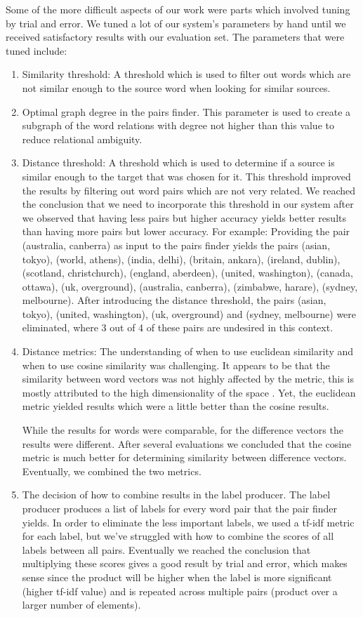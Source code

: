 \documentclass[11pt,a4paper]{article}
\begin{document}
Some of the more difficult aspects of our work were parts which involved tuning by trial and error. We tuned a lot of our system's parameters by hand until we received satisfactory results with our evaluation set. The parameters that were tuned include:
\begin{enumerate}
\item Similarity threshold: A threshold which is used to filter out words which are not similar enough to the source word when looking for similar sources.
\item Optimal graph degree in the pairs finder. This parameter is used to create a subgraph of the word relations with degree not higher than this value to reduce relational ambiguity.
\item Distance threshold: A threshold which is used to determine if a source is similar enough to the target that was chosen for it. This threshold improved the results by filtering out word pairs which are not very related. We reached the conclusion that we need to incorporate this threshold in our system after we observed that having less pairs but higher accuracy yields better results than having more pairs but lower accuracy.
For example: Providing the pair (australia, canberra) as input to the pairs finder yields the pairs (asian, tokyo), (world, athens), (india, delhi), (britain, ankara), (ireland, dublin), (scotland, christchurch), (england, aberdeen), (united, washington), (canada, ottawa), (uk, overground), (australia, canberra), (zimbabwe, harare), (sydney, melbourne). After introducing the distance threshold, the pairs (asian, tokyo), (united, washington), (uk, overground) and (sydney, melbourne) were eliminated, where 3 out of 4 of these pairs are undesired in this context.

\item Distance metrics: The understanding of when to use euclidean similarity and when to use cosine similarity was challenging. It appears to be that the similarity between word vectors was not highly affected by the metric, this is mostly attributed to the high dimensionality of the space \cite{qian2004similarity}. Yet, the euclidean metric yielded results which were a little better than the cosine results.

While the results for words were comparable, for the difference vectors the results were different. After several evaluations we concluded that the cosine metric is much better for determining similarity between difference vectors. Eventually, we combined the two metrics.

\item The decision of how to combine results in the label producer. The label producer produces a list of labels for every word pair that the pair finder yields. In order to eliminate the less important labels, we used a tf-idf metric for each label, but we've struggled with how to combine the scores of all labels between all pairs. Eventually we reached the conclusion that multiplying these scores gives a good result by trial and error, which makes sense since the product will be higher when the label is more significant (higher tf-idf value) and is repeated across multiple pairs (product over a larger number of elements).
\end{enumerate}
\end{document}
